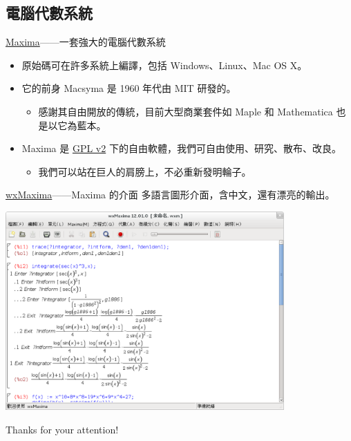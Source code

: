 \documentclass{beamer}
\theoremstyle{remark}
\begin{document}
\begin{CJK}{UTF8}{bsmi}
\section{電腦代數系統}
\begin{frame}{\href{http://maxima.sourceforge.net/}{Maxima}------一套強大的電腦代數系統}
  \begin{itemize}
    \item 原始碼可在許多系統上編譯，包括 Windows、Linux、Mac OS X。
    \item 它的前身 Macsyma 是 1960 年代由 MIT 研發的。
      \begin{itemize}
	\item 感謝其自由開放的傳統，目前大型商業套件如 Maple 和 Mathematica 也是以它為藍本。
      \end{itemize}
    \item Maxima 是 \href{http://www.gnu.org/licenses/gpl-2.0.html}{GPL v2}
      下的自由軟體，我們可自由使用、研究、散布、改良。
      \begin{itemize}
	\item 我們可以站在巨人的肩膀上，不必重新發明輪子。
      \end{itemize}
  \end{itemize}
\end{frame}

\begin{frame}{\href{http://andrejv.github.com/wxmaxima/}{wxMaxima}------Maxima 的介面}
  多語言圖形介面，含中文，還有漂亮的輸出。
  \begin{center}
    \href{http://andrejv.github.com/wxmaxima/}{\includegraphics[width=0.8\textwidth]{screenshot}}
  \end{center}
\end{frame}

\begin{frame}
  \begin{center}
    \huge Thanks for your attention!
  \end{center}
\end{frame}
\end{CJK}
\end{document}
